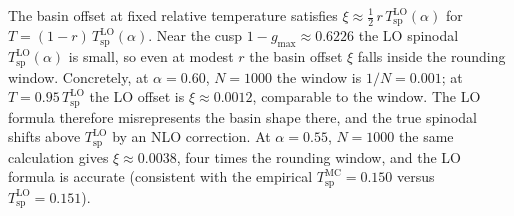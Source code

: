 \documentclass[11pt]{article}
\newcommand{\Tsp}{T_{\mathrm{sp}}}
\begin{document}
The basin offset at fixed relative temperature satisfies
$\xi \approx \tfrac12\,r\,\Tsp^{\mathrm{LO}}(\alpha)$ for
$T = (1-r)\,\Tsp^{\mathrm{LO}}(\alpha)$.  Near the cusp
$1 - g_{\max} \approx 0.6226$ the LO spinodal $\Tsp^{\mathrm{LO}}(\alpha)$
is small, so even at modest $r$ the basin offset $\xi$ falls inside
the rounding window.  Concretely, at $\alpha = 0.60$, $N = 1000$ the
window is $1/N = 0.001$; at $T = 0.95\,\Tsp^{\mathrm{LO}}$ the LO
offset is $\xi \approx 0.0012$, comparable to the window.  The LO
formula therefore misrepresents the basin shape there, and the true
spinodal shifts above $\Tsp^{\mathrm{LO}}$ by an NLO correction.  At
$\alpha = 0.55$, $N = 1000$ the same calculation gives $\xi \approx
0.0038$, four times the rounding window, and the LO formula is
accurate (consistent with the empirical $\Tsp^{\mathrm{MC}} = 0.150$
versus $\Tsp^{\mathrm{LO}} = 0.151$).
\end{document}
